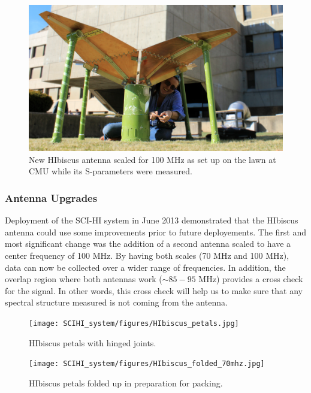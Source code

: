 \begin{figure}[htb]
\begin{center}
\includegraphics[width=0.95\linewidth]{SCIHI_system/figures/HIbiscus_100mhz.jpg}
\caption{New HIbiscus antenna scaled for 100 MHz as set up on the lawn at CMU while its S-parameters were measured. }
\label{Fig:hibiscus_100}
\end{center}
\end{figure}

\subsubsection{Antenna Upgrades}
Deployment of the SCI-HI system in June 2013 demonstrated that the HIbiscus antenna could use some improvements prior to future deployements. The first and most significant change was the addition of a second antenna scaled to have a center frequency of 100 MHz. By having both scales (70 MHz and 100 MHz), data can now be collected over a wider range of frequencies. In addition, the overlap region where both antennas work ($\sim 85-95$ MHz) provides a cross check for the signal. In other words, this cross check will help us to make sure that any spectral structure measured is not coming from the antenna. 

\begin{figure}[htb]
\centering
\begin{minipage}[b]{0.33\textwidth}
\centering
\texttt{[image: SCIHI\_system/figures/HIbiscus\_petals.jpg]}
\caption{HIbiscus petals with hinged joints.}
\label{Fig:hibiscus_petal}
\end{minipage}%
\begin{minipage}[b]{0.02\textwidth}
\hspace{1cm}
\end{minipage}%
\begin{minipage}[b]{0.61\textwidth}
\centering
\texttt{[image: SCIHI\_system/figures/HIbiscus\_folded\_70mhz.jpg]}
\caption{HIbiscus petals folded up in preparation for packing.}
\label{Fig:hibiscus_fold}
\end{minipage}
\end{figure}


